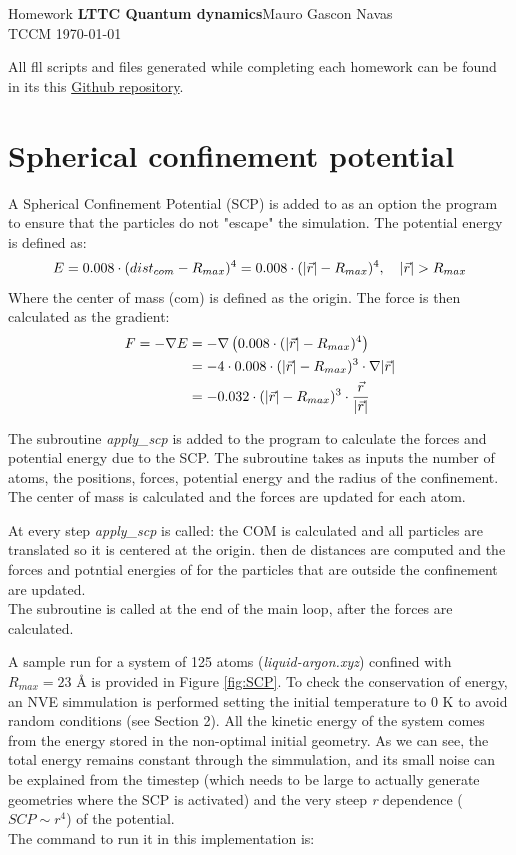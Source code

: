 \documentclass{cis320}
\begin{document}
\noindent Homework \textbf{LTTC Quantum dynamics}\hfill  Mauro Gascon Navas\\
TCCM \today

\hrulefill
\par
\vspace{1cm} 
All fll scripts and files generated while completing each homework can be found in its this \textcolor{blue}{\href{https://github.com/EliteSushi/LTTC2025/tree/main/Molecular_Dynamics}{Github repository}}.

\section{Spherical confinement potential}

A Spherical Confinement Potential (SCP) is added to as an option the program to ensure that the particles do not "escape" the simulation. The potential energy is defined as:
\[
E = 0.008 \cdot (dist_{com}-R_{max})^4 = 0.008 \cdot (\abs{\vec{r}}-R_{max})^4, \quad \abs{\vec{r}} > R_{max} 
\]
Where the center of mass (com) is defined as the origin. The force is then calculated as the gradient:
\[
\begin{aligned}
F = -\nabla E &= -\nabla \left( 0.008 \cdot (\abs{\vec{r}}-R_{max})^4 \right) \\
&= -4 \cdot 0.008 \cdot (\abs{\vec{r}}-R_{max})^3 \cdot \nabla \abs{\vec{r}} \\
&=-0.032 \cdot (\abs{\vec{r}}-R_{max})^3 \cdot \frac{\vec{r}}{\abs{\vec{r}}}
\end{aligned}
\]

The subroutine \textit{apply\_scp} is added to the program to calculate the forces and potential energy due to the SCP. The subroutine takes as inputs the number of atoms, the positions, forces, potential energy and the radius of the confinement. The center of mass is calculated and the forces are updated for each atom.\\
\par
At every step \textit{apply\_scp} is called: the COM is calculated and all particles are translated so it is centered at the origin. then de distances are computed and the forces and potntial energies of for the particles that are outside the confinement are updated.\\
The subroutine is called at the end of the main loop, after the forces are calculated.\\
\par
A sample run for a system of 125 atoms (\textit{liquid-argon.xyz}) confined with $R_{max}=23$ \r{A} is  provided in Figure \ref{fig:SCP}. To check the conservation of energy, an NVE simmulation is performed setting the initial temperature to 0 K to avoid random conditions (see Section 2). All the kinetic energy of the system comes from the energy stored in the non-optimal initial geometry. As we can see, the total energy remains constant through the simmulation, and its small noise can be explained from the timestep (which needs to be large to actually generate geometries where the SCP is activated) and the very steep \textit{r} dependence ($SCP \sim r^4$) of the potential. \\
The command to run it in this implementation is:
\end{document}
